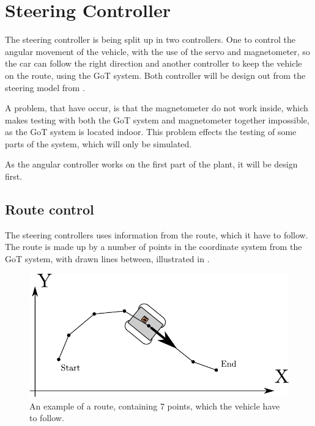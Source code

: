 \section{Steering Controller}\label{sec:steeringController}
The steering controller is being split up in two controllers. One to control the angular movement of the vehicle, with the use of the servo and magnetometer, so the car can follow the right direction and another controller to keep the vehicle on the route, using the GoT system. Both controller will be design out from the steering model from . 

A problem, that have occur, is that the magnetometer do not work inside, which makes testing with both the GoT system and magnetometer together impossible, as the GoT system is located indoor. This problem effects the testing of some parts of the system, which will only be simulated.

As the angular controller works on the first part of the plant, it will be design first.





\subsection{Route control}
The steering controllers uses information from the route, which it have to follow. The route is made up by a number of points in the coordinate system from the GoT system, with drawn lines between, illustrated in .

\begin{figure}[H]
 	\centering
 	\includegraphics[scale=0.7]{figures/stepsGoT}
 	\caption{An example of a route, containing 7 points, which the vehicle have to follow.}
 	\label{fig:RCfig1}
\end{figure}\vspace{-5mm}

